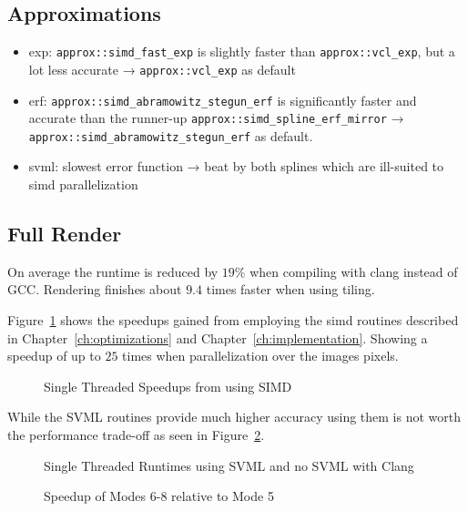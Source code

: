 \documentclass[a4paper, 11pt]{memoir}
\begin{document}
    \subsection{Approximations}
    \begin{itemize}
        \item exp: \texttt{approx::simd_fast_exp} is slightly faster than \texttt{approx::vcl_exp},
            but a lot less accurate →  \texttt{approx::vcl_exp} as default
        \item erf: \texttt{approx::simd_abramowitz_stegun_erf} is significantly faster and accurate than the
            runner-up \texttt{approx::simd_spline_erf_mirror} →  \texttt{approx::simd_abramowitz_stegun_erf}
            as default.
        \item svml: slowest error function →  beat by both splines which are ill-suited to simd parallelization
    \end{itemize}

    \subsection{Full Render}
    On average the runtime is reduced by $19\%$ when compiling with clang instead of GCC.
    Rendering finishes about $9.4$ times faster when using tiling.

    Figure~\ref{fig:runtimes_st_simd_speedup} shows
    the speedups gained from employing the \gls{simd} routines described in Chapter~\ref{ch:optimizations}
    and Chapter~\ref{ch:implementation}. Showing a speedup of up to $25$ times when
    parallelization over the images pixels.
    \begin{figure}[t]
        \centering
        
        \caption{Single Threaded Speedups from using \gls{SIMD}}
        \label{fig:runtimes_st_simd_speedup}
    \end{figure}

    While the SVML routines provide much higher accuracy using them is not worth the
    performance trade-off as seen in Figure~\ref{fig:runtimes_st_svml_v_no}.
    \begin{figure}[t]
        \centering
        
        \caption{Single Threaded Runtimes using SVML and no SVML with Clang}
        \label{fig:runtimes_st_svml_v_no}
    \end{figure}

    \begin{figure}[t]
        \centering
        
        \caption{Speedup of Modes 6-8 relative to Mode 5}
        \label{fig:runtimes_st_v_mt}
    \end{figure}
\end{document}
